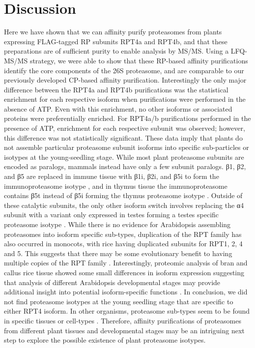 \section{Discussion}
	Here we have shown that we can affinity purify proteasomes from plants expressing FLAG-tagged RP subunits RPT4a and RPT4b, and that these preparations are of sufficient purity to enable analysis by MS/MS.  Using a LFQ-MS/MS strategy, we were able to show that these RP-based affinity purifications identify the core components of the 26S proteasome, and are comparable to our previously developed CP-based affinity purification. Interestingly the only major difference between the RPT4a and RPT4b purifications was the statistical enrichment for each respective isoform when purifications were performed in the absence of ATP. Even with this enrichment, no other isoforms or associated proteins were preferentially enriched. For RPT4a/b purifications performed in the presence of ATP, enrichment for each respective subunit was observed; however, this difference was not statistically significant. These data imply that plants do not assemble particular proteasome subunit isoforms into specific sub-particles or isotypes at the young-seedling stage. While most plant proteasome subunits are encoded as paralogs, mammals instead have only a few subunit paralogs. β1, β2, and β5 are replaced in immune tissue with β1i, β2i, and β5i to form the immunoproteasome isotype \citep{nandi96}, and in thymus tissue the immunoproteasome contains β5t instead of β5i forming the thymus proteasome isotype \citep{murata07}. Outside of these catalytic subunits, the only other isoform switch involves replacing the α4 subunit with a variant only expressed in testes forming a testes specific proteasome isotype \citep{belote98}.   While there is no evidence for Arabidopsis assembling proteasomes into isoform specific sub-types, duplication of the RPT family has also occurred in monocots, with rice having duplicated subunits for RPT1, 2, 4 and 5. This suggests that there may be some evolutionary benefit to having multiple copies of the RPT family \citep{shibahara04}. Interestingly, proteomic analysis of bran and callus rice tissue showed some small differences in isoform expression suggesting that analysis of different Arabidopsis developmental stages may provide additional insight into potential isoform-specific functions \citep{shibahara04}. In conclusion, we did not find proteasome isotypes at the young seedling stage that are specific to either RPT4 isoform. In other organisms, proteasome sub-types seem to be found in specific tissues or cell-types \citep{belote98, murata07, nandi96}. Therefore, affinity purifications of proteasomes from different plant tissues and developmental stages may be an intriguing next step to explore the possible existence of plant proteasome isotypes.
 

